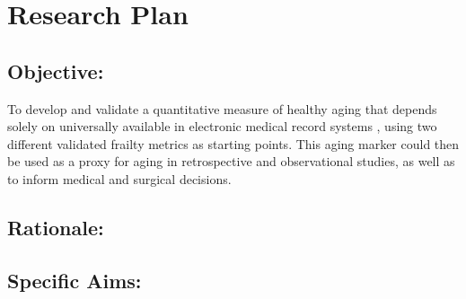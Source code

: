 \section{Research Plan }\label{research-plan}


\subsection{Objective:}\label{objective}
  
To develop and validate a quantitative measure of healthy aging that depends solely  on universally available in electronic medical record systems ,
using two different validated frailty metrics as starting points. This
aging marker could then be used as a proxy for aging in retrospective
and observational studies, as well as to inform medical and surgical
decisions.


\subsection{Rationale:}\label{rationale}

\subsection{Specific Aims:}\label{specific-aims}
